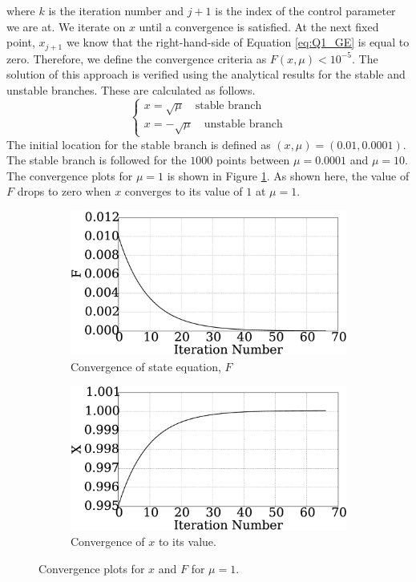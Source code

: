 where $k$ is the iteration number and $j+1$ is the index of the control parameter we are at. We iterate on $x$ until a convergence is satisfied. At the next fixed point, $x_{j+1}$ we know that the right-hand-side of Equation \eqref{eq:Q1_GE} is equal to zero. Therefore, we define the convergence criteria as $F(x, \mu) < 10^{-5}$. The solution of this approach is verified using the analytical results for the stable and unstable branches. These are calculated as follows.
%
\begin{equation}
\begin{cases}
	x = \sqrt{\mu} \quad \text{stable branch} \\
	x = -\sqrt{\mu} \quad \text{unstable branch}
\end{cases}
\end{equation}
%
The initial location for the stable branch is defined as $(x, \mu) = (0.01, 0.0001)$. The stable branch is followed for the $1000$ points between $\mu = 0.0001$ and $\mu = 10$. The convergence plots for $\mu = 1$ is shown in Figure \ref{fig:Q1_convergenceFORstable}. As shown here, the value of $F$ drops to zero when $x$ converges to its value of $1$ at $\mu = 1$.
%
\begin{figure}[h]
	\centering
	\begin{subfigure}[h]{8.0 cm}
		\includegraphics[width=8.0 cm]{figure/Q1/F_1.eps}
		\caption{Convergence of state equation, $F$}
	\end{subfigure}
	\begin{subfigure}[h]{8.0 cm}
        \includegraphics[width=8.0 cm]{figure/Q1/X_1.eps}
		\caption{Convergence of $x$ to its value.}
    \end{subfigure}
    \caption{Convergence plots for $x$ and $F$ for $\mu = 1$.}
    \label{fig:Q1_convergenceFORstable}
\end{figure}
%

